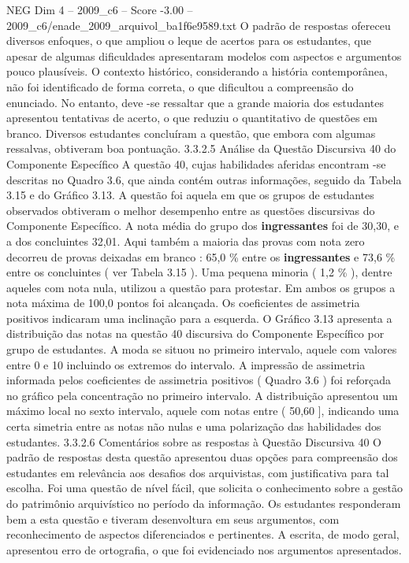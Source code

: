 \begin{textsample}{NEG Dim 4 – 2009\_c6 – Score -3.00 – 2009\_c6/enade\_2009\_arquivol\_ba1f6e9589.txt}
O padrão de respostas ofereceu diversos enfoques, o que ampliou o leque de acertos para os estudantes, que apesar de algumas dificuldades apresentaram modelos com aspectos e argumentos pouco plausíveis.
O contexto histórico, considerando a história contemporânea, não foi identificado de forma correta, o que dificultou a compreensão do enunciado.
No entanto, deve -se ressaltar que a grande maioria dos estudantes apresentou tentativas de acerto, o que reduziu o quantitativo de questões em branco.
Diversos estudantes concluíram a questão, que embora com algumas ressalvas, obtiveram boa pontuação. 3.3.2.5 Análise da Questão Discursiva 40 do Componente Específico A questão 40, cujas habilidades aferidas encontram -se descritas no Quadro 3.6, que ainda contém outras informações, seguido da Tabela 3.15 e do Gráfico 3.13.
A questão foi aquela em que os grupos de estudantes observados obtiveram o melhor desempenho entre as questões discursivas do Componente Específico.
A nota média do grupo dos \textbf{ingressantes} foi de 30,30, e a dos concluintes 32,01.
Aqui também a maioria das provas com nota zero decorreu de provas deixadas em branco : 65,0 \% entre os \textbf{ingressantes} e 73,6 \% entre os concluintes ( ver Tabela 3.15 ).
Uma pequena minoria ( 1,2 \% ), dentre aqueles com nota nula, utilizou a questão para protestar.
Em ambos os grupos a nota máxima de 100,0 pontos foi alcançada.
Os coeficientes de assimetria positivos indicaram uma inclinação para a esquerda.
O Gráfico 3.13 apresenta a distribuição das notas na questão 40 discursiva do Componente Específico por grupo de estudantes.
A moda se situou no primeiro intervalo, aquele com valores entre 0 e 10 incluindo os extremos do intervalo.
A impressão de assimetria informada pelos coeficientes de assimetria positivos ( Quadro 3.6 ) foi reforçada no gráfico pela concentração no primeiro intervalo.
A distribuição apresentou um máximo local no sexto intervalo, aquele com notas entre ( 50,60 ], indicando uma certa simetria entre as notas não nulas e uma polarização das habilidades dos estudantes. 3.3.2.6 Comentários sobre as respostas à Questão Discursiva 40 O padrão de respostas desta questão apresentou duas opções para compreensão dos estudantes em relevância aos desafios dos arquivistas, com justificativa para tal escolha.
Foi uma questão de nível fácil, que solicita o conhecimento sobre a gestão do patrimônio arquivístico no período da informação.
Os estudantes responderam bem a esta questão e tiveram desenvoltura em seus argumentos, com reconhecimento de aspectos diferenciados e pertinentes.
A escrita, de modo geral, apresentou erro de ortografia, o que foi evidenciado nos argumentos apresentados.

\end{textsample}
